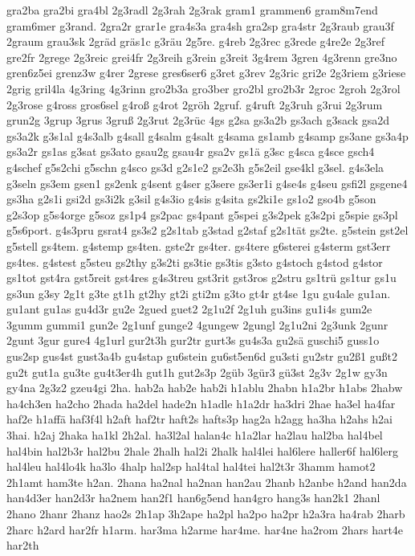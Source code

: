 {gra2ba
gra2bi
gra4bl
2g3radl
2g3rah
2g3rak
gram1
grammen6
gram8m7end
gram6mer
g3rand.
2gra2r
grar1e
gra4s3a
gra4sh
gra2sp
gra4str
2g3raub
grau3f
2graum
grau3sk
2gräd
gräs1c
g3räu
2g5re.
g4reb
2g3rec
g3rede
g4re2e
2g3ref
gre2fr
2grege
2g3reic
grei4fr
2g3reih
g3rein
g3reit
3g4rem
3gren
4g3renn
gre3no
gren6z5ei
grenz3w
g4rer
2grese
gres6ser6
g3ret
g3rev
2g3ric
gri2e
2g3riem
g3riese
2grig
gril4la
4g3ring
4g3rinn
gro2b3a
gro3ber
gro2bl
gro2b3r
2groc
2groh
2g3rol
2g3rose
g4ross
gros6sel
g4roß
g4rot
2gröh
2gruf.
g4ruft
2g3ruh
g3rui
2g3rum
grun2g
3grup
3grus
3gruß
2g3rut
2g3rüc
4gs
g2sa
gs3a2b
gs3ach
g3sack
gsa2d
gs3a2k
g3s1al
g4s3alb
g4sall
g4salm
g4salt
g4sama
gs1amb
g4samp
gs3ane
gs3a4p
gs3a2r
gs1as
g3sat
gs3ato
gsau2g
gsau4r
gsa2v
gs1ä
g3sc
g4sca
g4sce
gsch4
g4schef
g5s2chi
g5schn
g4sco
gs3d
g2s1e2
gs2e3h
g5s2eil
gse4kl
g3sel.
g4s3ela
g3seln
gs3em
gsen1
gs2enk
g4sent
g4ser
g3sere
gs3er1i
g4se4s
g4seu
gsfi2l
gsgene4
gs3ha
g2s1i
gsi2d
gs3i2k
g3sil
g4s3io
g4sis
g4sita
gs2ki1e
gs1o2
gso4b
g5son
g2s3op
g5s4orge
g5soz
gs1p4
gs2pac
gs4pant
g5spei
g3s2pek
g3s2pi
g5spie
gs3pl
g5s6port.
g4s3pru
gsrat4
gs3s2
g2s1tab
g3stad
g2staf
g2s1tät
gs2te.
g5stein
gst2el
g5stell
gs4tem.
g4stemp
gs4ten.
gste2r
gs4ter.
gs4tere
g6sterei
g4sterm
gst3err
gs4tes.
g4stest
g5steu
gs2thy
g3s2ti
gs3tie
gs3tis
g3sto
g4stoch
g4stod
g4stor
gs1tot
gst4ra
gst5reit
gst4res
g4s3treu
gst3rit
gst3ros
g2stru
gs1trü
gs1tur
gs1u
gs3un
g3sy
2g1t
g3te
gt1h
gt2hy
gt2i
gti2m
g3to
gt4r
gt4se
1gu
gu4ale
gu1an.
gu1ant
gu1as
gu4d3r
gu2e
2gued
guet2
2g1u2f
2g1uh
gu3ins
gu1i4s
gum2e
3gumm
gummi1
gun2e
2g1unf
gunge2
4gungew
2gungl
2g1u2ni
2g3unk
2gunr
2gunt
3gur
gure4
4g1url
gur2t3h
gur2tr
gurt3s
gu4s3a
gu2sä
guschi5
guss1o
gus2sp
gus4st
gust3a4b
gu4stap
gu6stein
gu6st5en6d
gu3sti
gu2str
gu2ß1
gußt2
gu2t
gut1a
gu3te
gu4t3er4h
gut1h
gut2s3p
2güb
3gür3
gü3st
2g3v
2g1w
gy3n
gy4na
2g3z2
gzeu4gi
2ha.
hab2a
hab2e
hab2i
h1ablu
2habn
h1a2br
h1abs
2habw
ha4ch3en
ha2cho
2hada
ha2del
hade2n
h1adle
h1a2dr
ha3dri
2hae
ha3el
ha4far
haf2e
h1affä
haf3f4l
h2aft
haf2tr
haft2s
hafts3p
hag2a
h2agg
ha3ha
h2ahs
h2ai
3hai.
h2aj
2haka
ha1kl
2h2al.
ha3l2al
halan4c
h1a2lar
ha2lau
hal2ba
hal4bel
hal4bin
hal2b3r
hal2bu
2hale
2halh
hal2i
2halk
hal4lei
hal6lere
haller6f
hal6lerg
hal4leu
hal4lo4k
ha3lo
4halp
hal2sp
hal4tal
hal4tei
hal2t3r
3hamm
hamot2
2h1amt
ham3te
h2an.
2hana
ha2nal
ha2nan
han2au
2hanb
h2anbe
h2and
han2da
han4d3er
han2d3r
ha2nem
han2f1
han6g5end
han4gro
hang3s
han2k1
2hanl
2hano
2hanr
2hanz
hao2s
2h1ap
3h2ape
ha2pl
ha2po
ha2pr
h2a3ra
ha4rab
2harb
2harc
h2ard
har2fr
h1arm.
har3ma
h2arme
har4me.
har4ne
ha2rom
2hars
hart4e
har2th
}
